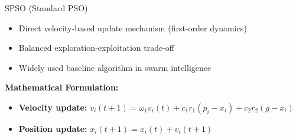 \documentclass[aspectratio=169]{beamer}
\begin{document}
\begin{frame}{SPSO (Standard PSO)}
    \begin{itemize}
        \item Direct velocity-based update mechanism (first-order dynamics)
        \item Balanced exploration-exploitation trade-off
        \item Widely used baseline algorithm in swarm intelligence
    \end{itemize}
    
    \textbf{Mathematical Formulation:} \\
    \begin{itemize}
        \item \textbf{Velocity update:} $v_i(t+1) = \omega_{1} v
    _i(t) + c_1 r_1(p_i - x_i) + c_2r_2(g-x_i)$
        \item \textbf{Position update:} $x_i(t+1) = x_i(t) + v_i(t+1)$
    \end{itemize}
\end{frame}
\end{document}
